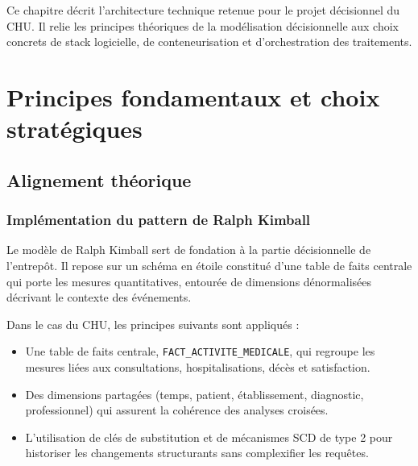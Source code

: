 \documentclass[12pt, a4paper]{report}
\begin{document}
Ce chapitre décrit l'architecture technique retenue pour le projet décisionnel du CHU. Il relie les principes théoriques de la modélisation décisionnelle aux choix concrets de stack logicielle, de conteneurisation et d'orchestration des traitements.

\section{Principes fondamentaux et choix stratégiques}

\subsection{Alignement théorique}

\subsubsection{Implémentation du pattern de Ralph Kimball}

Le modèle de Ralph Kimball sert de fondation à la partie décisionnelle de l'entrepôt. Il repose sur un schéma en étoile constitué d'une table de faits centrale qui porte les mesures quantitatives, entourée de dimensions dénormalisées décrivant le contexte des événements. 

Dans le cas du CHU, les principes suivants sont appliqués :

\begin{itemize}[label=\textcolor{chuBlue}{\textbullet}]
  \item Une table de faits centrale, \texttt{FACT\_ACTIVITE\_MEDICALE}, qui regroupe les mesures liées aux consultations, hospitalisations, décès et satisfaction.
  \item Des dimensions partagées (temps, patient, établissement, diagnostic, professionnel) qui assurent la cohérence des analyses croisées.
  \item L'utilisation de clés de substitution et de mécanismes SCD de type 2 pour historiser les changements structurants sans complexifier les requêtes.
\end{itemize}
\end{document}
